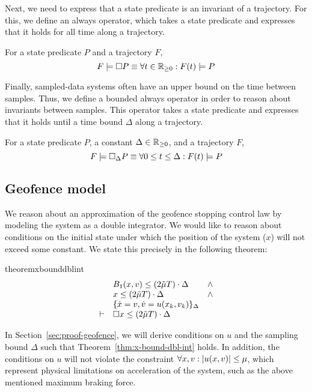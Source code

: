 Next, we need to express that a state predicate is an invariant of a
trajectory. For this, we define an always operator, which takes a state
predicate and expresses that it holds for all time along a trajectory.
\begin{definition}[Always]
For a state predicate $P$ and a trajectory $F$,
\[
F \models \Box{} P \equiv \forall t \in \mathbb{R}_{\geq 0} : F(t) \models P
\]
\label{def:always}
\end{definition}

Finally, sampled-data systems often have an upper bound on the time between
samples. Thus, we define a bounded always operator in order to reason about
invariants between samples. This operator takes a state predicate and
expresses that it holds until a time bound $\Delta$ along a trajectory.
\begin{definition}
For a state predicate $P$, a constant $\Delta \in \mathbb{R}_{\geq 0}$, and a trajectory $F$,
\[
F \models \Box{}_{\Delta} P \equiv \forall 0 \leq t \leq \Delta : F(t) \models P
\]
\label{def:bounded-always}
\end{definition}

\subsection{Geofence model}
We reason about an approximation of the geofence stopping control law by
modeling the system as a double integrator. We would like to reason about
conditions on the initial state under which the position of the system
($x$) will not exceed some constant. We state this precisely in the
following theorem:

\begin{restatable}{theorem}{xbounddblint}
\[
\begin{array}{clc}
&
B_1 (x,v) \leq (2\tilde{\mu} T) \cdot \Delta & \wedge \\
&
x \leq (2\tilde{\mu} T) \cdot \Delta & \wedge \\
&
\{\dot{x} = v, \dot{v} = u(x_k,v_k)\}_{\Delta} & \\
\vdash
&
\Box{} x \leq (2\tilde{\mu} T) \cdot \Delta &
\end{array}
\]
\label{thm:x-bound-dbl-int}
\end{restatable}

In Section~\ref{sec:proof-geofence}, we will derive conditions on $u$ and
the sampling bound $\Delta$ such that Theorem~\ref{thm:x-bound-dbl-int}
holds. In addition, the conditions on $u$ will not violate the constraint
$\forall x, v : |u(x,v)| \leq \mu$, which represent physical limitations
on acceleration of the system, such as the above mentioned maximum braking
force.

